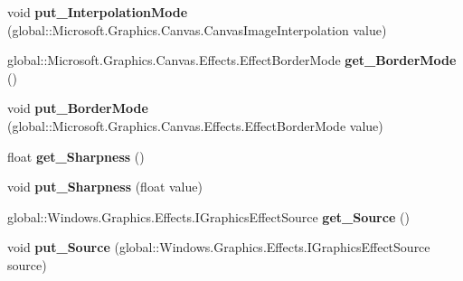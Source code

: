 \begin{DoxyCompactItemize}
void {\bfseries put\+\_\+\+Interpolation\+Mode} (global\+::\+Microsoft.\+Graphics.\+Canvas.\+Canvas\+Image\+Interpolation value)
\item 
\mbox{\label{class_microsoft_1_1_graphics_1_1_canvas_1_1_effects_1_1_scale_effect_a55f6daa77f8e87c93bb16bad1b42f66f}} 
global\+::\+Microsoft.\+Graphics.\+Canvas.\+Effects.\+Effect\+Border\+Mode {\bfseries get\+\_\+\+Border\+Mode} ()
\item 
\mbox{\label{class_microsoft_1_1_graphics_1_1_canvas_1_1_effects_1_1_scale_effect_a748186f5dde4594a532a983139ef9de8}} 
void {\bfseries put\+\_\+\+Border\+Mode} (global\+::\+Microsoft.\+Graphics.\+Canvas.\+Effects.\+Effect\+Border\+Mode value)
\item 
\mbox{\label{class_microsoft_1_1_graphics_1_1_canvas_1_1_effects_1_1_scale_effect_af9d7328518a161e33d134e8404c3e782}} 
float {\bfseries get\+\_\+\+Sharpness} ()
\item 
\mbox{\label{class_microsoft_1_1_graphics_1_1_canvas_1_1_effects_1_1_scale_effect_a3bcc5dd4772695632d028990483c624d}} 
void {\bfseries put\+\_\+\+Sharpness} (float value)
\item 
\mbox{\label{class_microsoft_1_1_graphics_1_1_canvas_1_1_effects_1_1_scale_effect_af287f17af67dcd8ef6e6aa2531b676f1}} 
global\+::\+Windows.\+Graphics.\+Effects.\+I\+Graphics\+Effect\+Source {\bfseries get\+\_\+\+Source} ()
\item 
\mbox{\label{class_microsoft_1_1_graphics_1_1_canvas_1_1_effects_1_1_scale_effect_a73f7590753a1ddd74e6477cde664e94d}} 
void {\bfseries put\+\_\+\+Source} (global\+::\+Windows.\+Graphics.\+Effects.\+I\+Graphics\+Effect\+Source source)
\item 
\mbox{\label{class_microsoft_1_1_graphics_1_1_canvas_1_1_effects_1_1_scale_effect_a9e3c1a9ee680f9c659f885df60ebf172}} 

\end{DoxyCompactItemize}
